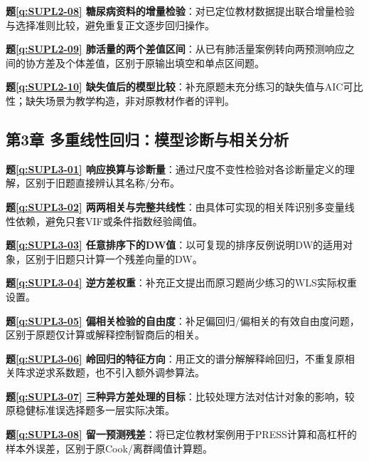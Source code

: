 \noindent\textbf{题\ref*{q:SUPL2-08} 糖尿病资料的增量检验}：对已定位教材数据提出联合增量检验与选择准则比较，避免重复正文逐步回归操作。\par

\noindent\textbf{题\ref*{q:SUPL2-09} 肺活量的两个差值区间}：从已有肺活量案例转向两预测响应之间的协方差及个体差值，区别于原输出填空和单点区间题。\par

\noindent\textbf{题\ref*{q:SUPL2-10} 缺失值后的模型比较}：补充原题未充分练习的缺失值与AIC可比性；缺失场景为教学构造，非对原教材作者的评判。\par

\subsection*{第3章 多重线性回归：模型诊断与相关分析}

\noindent\textbf{题\ref*{q:SUPL3-01} 响应换算与诊断量}：通过尺度不变性检验对各诊断量定义的理解，区别于旧题直接辨认其名称/分布。\par

\noindent\textbf{题\ref*{q:SUPL3-02} 两两相关与完整共线性}：由具体可实现的相关阵识别多变量线性依赖，避免只套VIF或条件指数经验阈值。\par

\noindent\textbf{题\ref*{q:SUPL3-03} 任意排序下的DW值}：以可复现的排序反例说明DW的适用对象，区别于旧题只计算一个残差向量的DW。\par

\noindent\textbf{题\ref*{q:SUPL3-04} 逆方差权重}：补充正文提出而原习题尚少练习的WLS实际权重设置。\par

\noindent\textbf{题\ref*{q:SUPL3-05} 偏相关检验的自由度}：补足偏回归/偏相关的有效自由度问题，区别于原题仅计算或解释控制智商后的相关。\par

\noindent\textbf{题\ref*{q:SUPL3-06} 岭回归的特征方向}：用正文的谱分解解释岭回归，不重复原相关阵求逆求系数题，也不引入额外调参算法。\par

\noindent\textbf{题\ref*{q:SUPL3-07} 三种异方差处理的目标}：比较处理方法对估计对象的影响，较原稳健标准误选择题多一层实际决策。\par

\noindent\textbf{题\ref*{q:SUPL3-08} 留一预测残差}：将已定位教材案例用于PRESS计算和高杠杆的样本外误差，区别于原Cook/离群阈值计算题。\par


